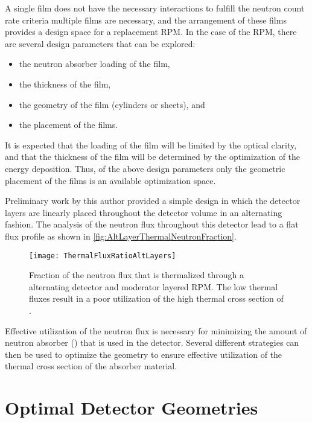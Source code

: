 A single film does not have the necessary interactions to fulfill the neutron count rate criteria multiple films are necessary, and the arrangement of these films provides a design space for a replacement RPM.
In the case of the RPM, there are several design parameters that can be explored:
\begin{itemize}
  \item the neutron absorber loading of the film,
  \item the thickness of the film,
  \item the geometry of the film (cylinders or sheets), and
  \item the placement of the films.
\end{itemize}
It is expected that the loading of the film will be limited by the optical clarity, and that the thickness of the film will be determined by the optimization of the energy deposition.
Thus, of the above design parameters only the geometric placement of the films is an available optimization space.

Preliminary work by this author provided a simple design in which the detector layers are linearly placed throughout the detector volume in an alternating fashion.
The analysis of the neutron flux throughout this detector lead to a flat flux profile as shown in \autoref{fig:AltLayerThermalNeutronFraction}.
\begin{figure}
  \texttt{[image: ThermalFluxRatioAltLayers]}
	\caption{Fraction of the neutron flux that is thermalized through a alternating detector and moderator layered RPM.  The low thermal fluxes result in a poor utilization of the high thermal cross section of .}
	\label{fig:AltLayerThermalNeutronFraction}
\end{figure}
Effective utilization of the neutron flux is necessary for minimizing the amount of neutron absorber () that is used in the detector.
Several different strategies can then be used to optimize the geometry to ensure effective utilization of the thermal cross section of the absorber material.

\section{Optimal Detector Geometries}


